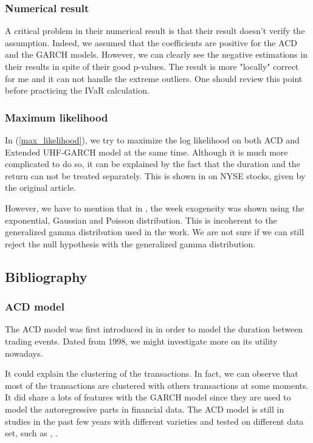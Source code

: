 \documentclass[12pt, a4paper]{article}
\begin{document}
\subsubsection{Numerical result}
A critical problem in their numerical result is that their result doesn't verify the assumption. Indeed, we assumed that the coefficients are positive for the ACD and the GARCH models. However, we can clearly see the negative estimations in their results in spite of their good p-values. The result is more "locally" correct for me and it can not handle the extreme outliers. One should review this point before practicing the IVaR calculation.

\subsubsection{Maximum likelihood}
In (\ref{max_likelihood}), we try to maximize the log likelihood on both ACD and Extended UHF-GARCH model at the same time. Although it is much more complicated to do so, it can be explained by the fact that the duration and the return can not be treated separately. This is shown in \cite{dur_return} on NYSE stocks, given by the original article.

However, we have to mention that in \cite{dur_return}, the week exogeneity was shown using the exponential, Gaussian and Poisson distribution. This is incoherent to the generalized gamma distribution used in the work. We are not sure if we can still reject the null hypothesis with the generalized gamma distribution.

\subsection{Bibliography}
\subsubsection{ACD model}
The ACD model was first introduced in \cite{ACD} in order to model the duration between trading events. Dated from 1998, we might investigate more on its utility nowadays.

It could explain the clustering of the transactions. In fact, we can observe that most of the transactions are clustered with others transactions at some moments. It did share a lots of features with the GARCH model since they are used to model the autoregressive parts in financial data. The ACD model is still in studies in the past few years with different varieties and tested on different data set, such as \cite{acd_NYSE}, \cite{nonstationary_acd}.
\end{document}
